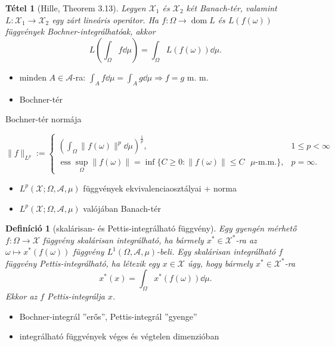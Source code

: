 \documentclass{beamer} %
\newtheorem{theo}[lem]{Tétel}
\newtheorem{defi}[lem]{Definíció}
\DeclareMathOperator{\dom}{dom}
\DeclareMathOperator{\ess}{ess}
\begin{document}
\begin{frame}
\justifying
\begin{theo}[Hille, Theorem 3.13] Legyen $\mathcal{X}_1$ és $\mathcal{X}_2$ két Banach-tér, valamint $L \colon \mathcal{X}_1 \to \mathcal{X}_2$ egy zárt lineáris operátor. Ha $f \colon \Omega \to \dom L$ és $L(f(\omega))$ függvények Bochner-integrálhatóak, akkor
$$L\left(\int_{\Omega} f \dd{\mu} \right) = \int_{\Omega} L(f(\omega)) \dd{\mu}.$$
\end{theo}
\begin{itemize}
\pause \item minden $A \in \mathcal{A}$-ra: $\int_{A} f \dd{\mu} = \int_{A} g \dd{\mu} \Longrightarrow f = g$ m. m.
\pause \item Bochner-tér
\end{itemize}

\pause Bochner-tér normája

\begin{displaymath}
 \| f \|_{L^p} := \left\{
    \begin{array}{ll}
      \left(\int_{\Omega} \| f(\omega) \|^p  \dd{\mu} \right)^{\frac{1}{p}}, &  1 \leqslant p < \infty \\
      \ess\sup_{\Omega} \|f(\omega)\| = \inf \lbrace C \geqslant 0 : \|f(\omega)\| \leqslant C \text{ $\mu$-m.m.} \rbrace, &  p = \infty.
    \end{array}
  \right.
\end{displaymath}
\end{frame}

\begin{frame} 
\justifying
\begin{itemize}
\item $L^p(\mathcal{X}; \Omega, \mathcal{A}, \mu)$ függvények ekvivalenciaosztályai + norma
\pause \item $L^p(\mathcal{X}; \Omega, \mathcal{A}, \mu)$ valójában Banach-tér
\end{itemize}
\end{frame}

\begin{frame}
\justifying
\begin{defi}[skalárisan- és Pettis-integrálható függvény] Egy gyengén mérhető $f \colon \Omega \to \mathcal{X}$ függvény skalárisan integrálható, ha bármely $x^* \in \mathcal{X}^*$-ra az $\omega \mapsto x^*(f(\omega))$ függvény $L^1(\Omega, \mathcal{A},\mu)$-beli. Egy skalárisan integrálható $f$ függvény Pettis-integrálható, ha létezik egy $x \in \mathcal{X}$ úgy, hogy bármely $x^* \in \mathcal{X}^*$-ra
$$x^*(x) = \int_{\Omega} x^*(f(\omega))\dd{\mu}.$$
Ekkor az $f$ Pettis-integrálja $x$.
\end{defi}
\begin{itemize}
\pause \item Bochner-integrál ''erős'', Pettis-integrál ''gyenge''
\pause \item integrálható függvények véges és végtelen dimenzióban
\end{itemize}
\end{frame}
\end{document}
